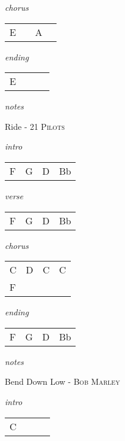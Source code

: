 \documentclass[12pt]{article}
\begin{document}
\textit{chorus}

\begin{tabular}{|P{1.25in}|P{1.25in}|P{1.25in}|P{1.25in}|}
  E &   & A  &   \\
\end{tabular}

\textit{ending}

\begin{tabular}{|P{1.25in}|P{1.25in}|P{1.25in}|P{1.25in}|}
  E &   &   &   \\
\end{tabular}

\textit{notes}

\newpage

{\Huge Ride} {\huge - \textsc{21 Pilots}}

\huge
\textit{intro}

\begin{tabular}{|P{1.25in}|P{1.25in}|P{1.25in}|P{1.25in}|}
  F & G  &  D &  Bb \\
\end{tabular}

\textit{verse}

\begin{tabular}{|P{1.25in}|P{1.25in}|P{1.25in}|P{1.25in}|}
  F & G  &  D &  Bb \\
\end{tabular}

\textit{chorus}

\begin{tabular}{|P{1.25in}|P{1.25in}|P{1.25in}|P{1.25in}|}
  C &  D &   C &  C  \\
  F &    &     &     \\
  
\end{tabular}

\textit{ending}

\begin{tabular}{|P{1.25in}|P{1.25in}|P{1.25in}|P{1.25in}|}
  F &  G & D  &  Bb \\
\end{tabular}

\textit{notes}

\newpage

{\Huge Bend Down Low} {\huge - \textsc{Bob Marley}}

\huge
\textit{intro}

\begin{tabular}{|P{1.25in}|P{1.25in}|P{1.25in}|P{1.25in}|}
  C &   &   &   \\
\end{tabular}
\end{document}
